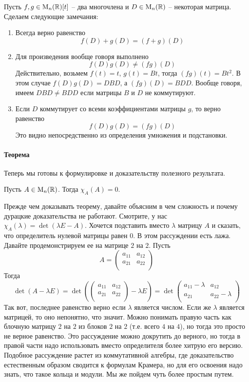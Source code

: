 Пусть $f,g\in\operatorname{M}_{n}(\mathbb R)[t]$ -- два многочлена и $D\in\operatorname{M}_{n}(\mathbb R)$ -- некоторая матрица.
Сделаем следующие замечания:
\begin{enumerate}
\item Всегда верно равенство
\[
f(D) + g(D) = (f + g)(D)
\]
\item Для произведения вообще говоря выполнено
\[
f(D)g(D)\neq (fg)(D)
\]
Действительно, возьмем $f(t) = t$, $g(t) = Bt$, тогда $(fg)(t) = Bt^2$.
В этом случае $f(D)g(D) = DBD$, а $(fg)(D) = BDD$.
Вообще говоря, имеем $DBD \neq BDD$ если матрицы $B$ и $D$ не коммутируют.

\item Если $D$ коммутирует со всеми коэффициентами матрицы $g$, то верно равенство
\[
f(D)g(D) = (fg)(D)
\]
Это видно непосредственно из определения умножения и подстановки.
\end{enumerate}

\paragraph{Теорема}

Теперь мы готовы к формулировке и доказательству полезного результата.

\begin{claim}
Пусть $A\in\operatorname{M}_{n}(\mathbb R)$.
Тогда $\chi_A(A) = 0$.
\end{claim}

Прежде чем доказывать теорему, давайте объясним в чем сложность и почему дурацкие доказательства не работают.
Смотрите, у нас $\chi_A(\lambda) = \det(\lambda E - A)$.
Хочется подставить вместо $\lambda$ матрицу $A$ и сказать, что определитель нулевой матрицы равен $0$.
В этом рассуждении есть лажа.
Давайте продемонстрируем ее на матрице $2$ на $2$.
Пусть
\[
A = 
\begin{pmatrix}
{a_{11}}&{a_{12}}\\
{a_{21}}&{a_{22}}\\
\end{pmatrix}
\]
Тогда
\[
\det(A-\lambda E) =
\det
\left(
\begin{pmatrix}
{a_{11}}&{a_{12}}\\
{a_{21}}&{a_{22}}\\
\end{pmatrix}
-\lambda E
\right)=
\det 
\begin{pmatrix}
{a_{11}-\lambda}&{a_{12}}\\
{a_{21}}&{a_{22}-\lambda}\\
\end{pmatrix}
\]
Так вот, последнее равенство верно если $\lambda$ является числом.
Если же $\lambda$ является матрицей, то оно непонятно, что значит.
Можно понимать правую часть как блочную матрицу $2$ на $2$ из блоков $2$ на $2$ (т.е. всего $4$ на $4$), но тогда это просто не верное равенство.
Это рассуждение можно докрутить до верного, но тогда в правой части надо использовать вместо определителя более хитрую его версию.
Подобное рассуждение растет из коммутативной алгебры, где доказательство естественным образом сводится к формулам Крамера, но для его освоения надо знать, что такое кольца и модули.
Мы же пойдем чуть более простым путем.

